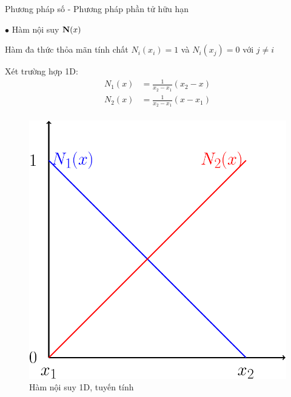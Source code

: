 \documentclass[aspectratio=169, t]{beamer} %
\begin{document}
\begin{frame}{Phương pháp số - Phương pháp phần tử hữu hạn}

$\bullet$ Hàm nội suy ${\bf N}(x)$

Hàm đa thức thỏa mãn tính chất $N_i(x_i) = 1$ và $N_i(x_j) = 0$ với $j \neq i$

Xét trường hợp 1D:
\begin{equation}\label{eq_shape1D}
    \begin{aligned}
        N_1(x) &= \frac{1}{x_2-x_1}\left(x_2-x\right) \\
        N_2(x) &= \frac{1}{x_2-x_1}\left(x-x_1\right) \\
    \end{aligned}
\end{equation}

\begin{figure}
    \centering
    \includegraphics[width=0.16\linewidth]{Slides/Figure/shape_func.pdf}
    \caption{Hàm nội suy 1D, tuyến tính}
\end{figure}

\end{frame}
\end{document}
